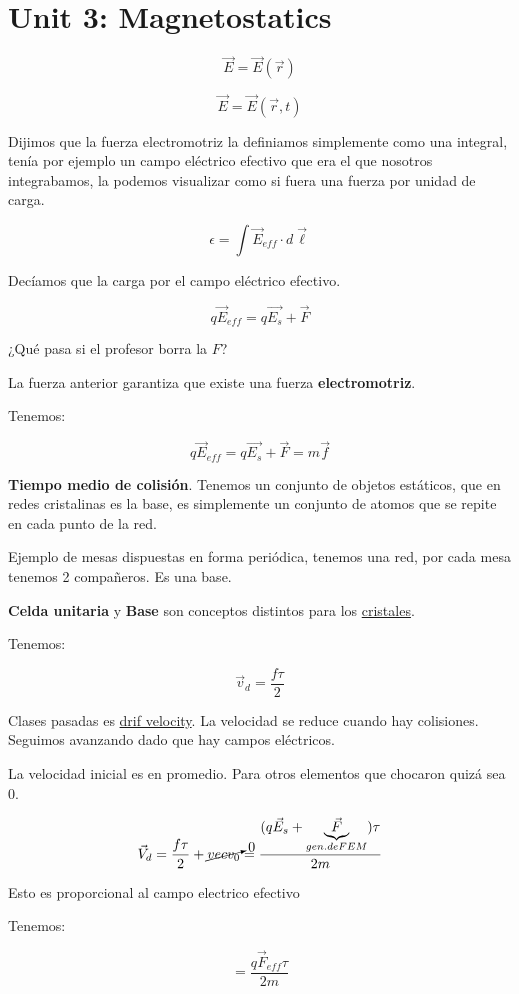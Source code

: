 \documentclass{article}
\begin{document}
\section{Unit 3: Magnetostatics}


\[ \vec{E} = \vec{E}(\vec{r})  \]

\[ \vec{E} = \vec{E}(\vec{r},t) \]

Dijimos que la fuerza electromotriz la definiamos simplemente como una integral, tenía por ejemplo un campo eléctrico efectivo que era el que nosotros integrabamos, la podemos visualizar como si fuera una fuerza por unidad de carga.

\[  \epsilon = \int\limits \vec{E}_{eff} \cdot d\vec{\ell}   \]


Decíamos que la carga por el campo eléctrico efectivo.


\[  q\vec{E}_{eff} = q\vec{E_{s}} +\vec{F} \]

¿Qué pasa si el profesor borra la $F$?


La fuerza anterior garantiza que existe una fuerza \textbf{electromotriz}.


Tenemos:

\[  q\vec{E}_{eff} = q\vec{E_{s}} +\vec{F} = m\vec{f} \]

\textbf{Tiempo medio de colisión}. Tenemos un conjunto de objetos estáticos, que en redes cristalinas es la base, es simplemente un conjunto de atomos que se repite en cada punto de la red.

Ejemplo de mesas dispuestas en forma periódica, tenemos una red, por cada mesa tenemos 2 compañeros. Es una base. 

\textbf{Celda unitaria} y \textbf{Base} son conceptos distintos para los \underline{cristales}.


Tenemos:

\[ \vec{v}_{d} = \frac{f\tau}{2} \]

Clases pasadas es \underline{drif velocity}. La velocidad se reduce cuando hay colisiones. Seguimos avanzando dado que hay campos eléctricos.


La velocidad inicial es en promedio. Para otros elementos que chocaron quizá sea $0$.

\[  \vec{V}_{d} = \frac{f\tau}{2} + \cancelto{0}{vec{v_{0}}} = \frac{  ( q\vec{E}_{s} + \underbrace{\vec{F}}_{gen. de FEM}   )\tau }{2m} \]


Esto es proporcional al campo electrico efectivo

Tenemos:


\[ = \frac{q\vec{F}_{eff}\tau}{2m}\]
\end{document}
